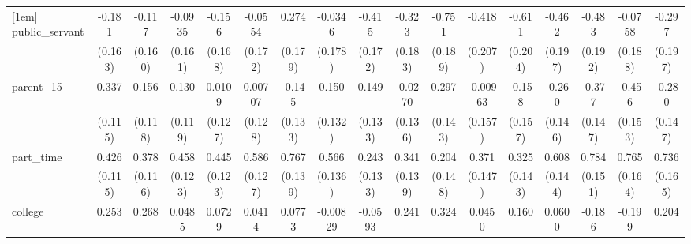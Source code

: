 {\begin{tabular}{l*{16}{c}}
[1em]
public\_servant      &      -0.181         &      -0.117         &     -0.0935         &      -0.156         &     -0.0554         &       0.274         &     -0.0346         &      -0.415\sym{*}  &      -0.323         &      -0.751\sym{***}&      -0.418\sym{*}  &      -0.611\sym{**} &      -0.462\sym{*}  &      -0.483\sym{*}  &     -0.0758         &      -0.297         \\
                    &     (0.163)         &     (0.160)         &     (0.161)         &     (0.168)         &     (0.172)         &     (0.179)         &     (0.178)         &     (0.172)         &     (0.183)         &     (0.189)         &     (0.207)         &     (0.204)         &     (0.197)         &     (0.192)         &     (0.188)         &     (0.197)         \\
[1em]
parent\_15           &       0.337\sym{**} &       0.156         &       0.130         &      0.0109         &     0.00707         &      -0.145         &       0.150         &       0.149         &     -0.0270         &       0.297\sym{*}  &    -0.00963         &      -0.158         &      -0.260         &      -0.377\sym{*}  &      -0.456\sym{**} &      -0.280         \\
                    &     (0.115)         &     (0.118)         &     (0.119)         &     (0.127)         &     (0.128)         &     (0.133)         &     (0.132)         &     (0.133)         &     (0.136)         &     (0.143)         &     (0.157)         &     (0.157)         &     (0.146)         &     (0.147)         &     (0.153)         &     (0.147)         \\
[1em]
part\_time           &       0.426\sym{***}&       0.378\sym{**} &       0.458\sym{***}&       0.445\sym{***}&       0.586\sym{***}&       0.767\sym{***}&       0.566\sym{***}&       0.243         &       0.341\sym{*}  &       0.204         &       0.371\sym{*}  &       0.325\sym{*}  &       0.608\sym{***}&       0.784\sym{***}&       0.765\sym{***}&       0.736\sym{***}\\
                    &     (0.115)         &     (0.116)         &     (0.123)         &     (0.123)         &     (0.127)         &     (0.139)         &     (0.136)         &     (0.133)         &     (0.139)         &     (0.148)         &     (0.147)         &     (0.143)         &     (0.144)         &     (0.151)         &     (0.164)         &     (0.165)         \\
[1em]
college             &       0.253         &       0.268\sym{*}  &      0.0485         &      0.0729         &      0.0414         &      0.0773         &    -0.00829         &     -0.0593         &       0.241         &       0.324\sym{*}  &      0.0450         &       0.160         &      0.0600         &      -0.186         &      -0.199         &       0.204         \\

\end{tabular}}
